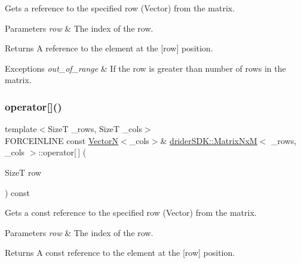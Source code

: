 Gets a reference to the specified row (Vector) from the matrix.


\begin{DoxyParams}{Parameters}
{\em row} & The index of the row.\\
\hline
\end{DoxyParams}
\begin{DoxyReturn}{Returns}
A reference to the element at the \mbox{[}row\mbox{]} position.
\end{DoxyReturn}

\begin{DoxyExceptions}{Exceptions}
{\em out\+\_\+of\+\_\+range} & If the row is greater than number of rows in the matrix. \\
\hline
\end{DoxyExceptions}
\mbox{\label{classdrider_s_d_k_1_1_matrix_nx_m_a043966a6ae4d2bca20bdb7193cdc7364}} 
\subsubsection{\texorpdfstring{operator[]()}{operator[]()}\hspace{0.1cm}{\footnotesize\ttfamily [2/2]}}
{\footnotesize\ttfamily template$<$SizeT \+\_\+rows, SizeT \+\_\+cols$>$ \\
F\+O\+R\+C\+E\+I\+N\+L\+I\+NE const \hyperlink{classdrider_s_d_k_1_1_vector_n}{VectorN}$<$\+\_\+cols$>$\& \hyperlink{classdrider_s_d_k_1_1_matrix_nx_m}{drider\+S\+D\+K\+::\+Matrix\+NxM}$<$ \+\_\+rows, \+\_\+cols $>$\+::operator\mbox{[}$\,$\mbox{]} (\begin{DoxyParamCaption}\item[{SizeT}]{row }\end{DoxyParamCaption}) const\hspace{0.3cm}{\ttfamily [inline]}}

Gets a const reference to the specified row (Vector) from the matrix.


\begin{DoxyParams}{Parameters}
{\em row} & The index of the row.\\
\hline
\end{DoxyParams}
\begin{DoxyReturn}{Returns}
A const reference to the element at the \mbox{[}row\mbox{]} position.
\end{DoxyReturn}

